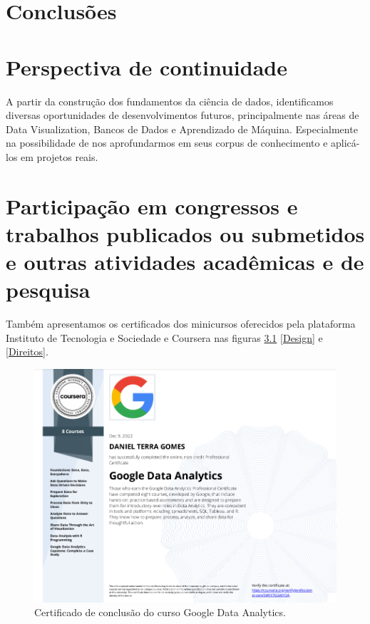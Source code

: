 \chapter{Conclusões} \label{concl}


\chapter{Perspectiva de continuidade} \label{continuidade}
A partir da construção dos fundamentos da ciência de dados, identificamos diversas oportunidades de desenvolvimentos futuros, principalmente nas áreas de Data Visualization, Bancos de Dados e Aprendizado de Máquina. Especialmente na possibilidade de nos aprofundarmos em seus corpus de conhecimento e aplicá-los em projetos reais. 

\chapter{Participação em congressos e trabalhos publicados ou submetidos e outras
atividades acadêmicas e de pesquisa} \label{eventos}

Também apresentamos os certificados dos minicursos oferecidos pela plataforma Instituto de Tecnologia e Sociedade e Coursera  nas figuras \ref{Google} \ref{Design} e \ref{Direitos}.


\begin{figure}[H]
\centering
\includegraphics[width=\textwidth]{Figures/google.png}
\caption{Certificado de conclusão do curso Google Data Analytics.}
\label{Google}
\end{figure}

